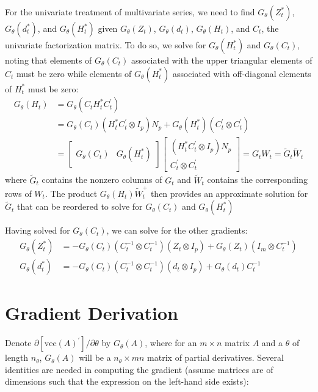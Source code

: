\documentclass[12pt]{article}
\newcommand{\Gt}{G_\theta}
\newcommand{\vecop}[0]{\text{vec}}
\begin{document}
	For the univariate treatment of multivariate series, we need to find $\Gt(Z_t^*)$, $\Gt(d_t^*)$, and $\Gt(H_t^*)$ given $\Gt(Z_t)$, $\Gt(d_t)$, $\Gt(H_t)$, and $C_t$, the univariate factorization matrix. To do so, we  solve for $\Gt(H_t^*)$ and $\Gt(C_t)$, noting that elements of $\Gt(C_t)$ associated with the upper triangular elements of $C_t$ must be zero while elements of $\Gt(H_t^*)$ associated with off-diagonal elements of $H_t^*$ must be zero: 
	\begin{align*}
	\Gt(H_t) &= \Gt(C_t H_t^* C_t^\prime) \\
	&= \Gt(C_t)(H_t^* C_t^\prime \otimes I_p) N_p + \Gt(H_t^*)(C_t^\prime \otimes C_t^\prime) \\
	&= \begin{bmatrix} \Gt(C_t) & \Gt(H_t^*) \end{bmatrix} \begin{bmatrix} (H_t^* C_t^\prime \otimes I_p) N_p \\ C_t^\prime \otimes C_t^\prime \end{bmatrix} 
	= G_t W_t
	= \tilde{G}_t \tilde{W}_t
	\end{align*}
	where $\tilde{G}_t$ contains the nonzero columns of $G_t$ and $\tilde{W}_t$ contains the corresponding rows of $W_t$. The product $\Gt(H_t) \tilde{W}_t^+$ then provides an approximate solution for $\tilde{G}_t$ that can be reordered to solve for $\Gt(C_t)$ and $\Gt(H_t^*)$

	Having solved for $\Gt(C_t)$, we can solve for the other gradients: 
	\begin{align*} 
	\Gt(Z_t^*) &= -\Gt(C_t)(C_t^{-1} \otimes C_t^{-1})(Z_t \otimes I_p) + \Gt(Z_t)(I_m \otimes C_t^{-1}) \\
	\Gt(d_t^*) &= -\Gt(C_t)(C_t^{-1} \otimes C_t^{-1})(d_t \otimes I_p) + \Gt(d_t)C_t^{-1}
	\end{align*}

\appendix
\newpage
\section{Gradient Derivation} \label{sec:gradient_derivation}
	Denote $\partial \left[ \vecop(A)^\prime \right] / \partial \theta$ by $\Gt(A)$, where for an $m \times n$ matrix $A$ and a $\theta$ of length $n_\theta$, $\Gt(A)$ will be a $n_\theta \times mn$ matrix of partial derivatives. Several identities are needed in computing the gradient (assume matrices are of dimensions such that the expression on the left-hand side exists):
\end{document}
